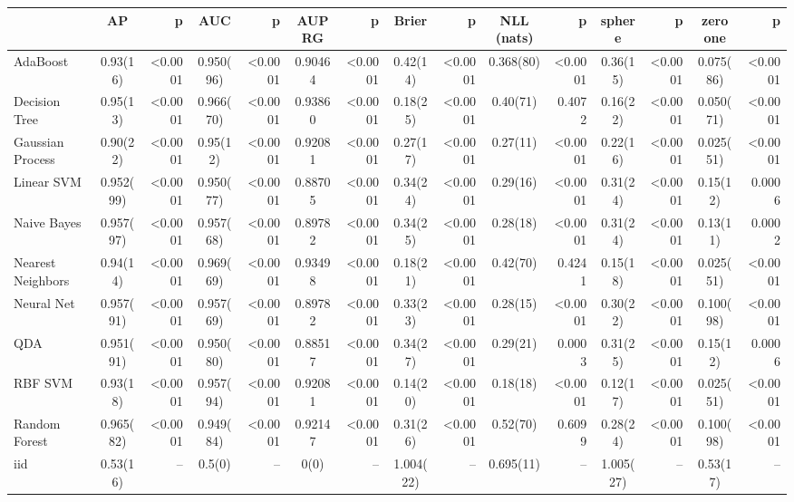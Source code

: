 \documentclass{article}
\begin{document}
{\tiny
\begin{tabular}{|l|Sr|Sr|Sr|Sr|Sr|Sr|Sr|}
\toprule
{}                &       {AP} &      {p} &      {AUC} &      {p} &  {AUPRG} &      {p} &    {Brier} &      {p} & {NLL (nats)} &      {p} &   {sphere} &      {p} & {zero one} &      {p} \\
\midrule
AdaBoost          &  0.93(16)  &  <0.0001 &  0.950(96) &  <0.0001 &  0.90464 &  <0.0001 &  0.42(14)  &  <0.0001 &    0.368(80) &  <0.0001 &  0.36(15)  &  <0.0001 &  0.075(86) &  <0.0001 \\
Decision Tree     &  0.95(13)  &  <0.0001 &  0.966(70) &  <0.0001 &  0.93860 &  <0.0001 &  0.18(25)  &  <0.0001 &    0.40(71)  &   0.4072 &  0.16(22)  &  <0.0001 &  0.050(71) &  <0.0001 \\
Gaussian Process  &  0.90(22)  &  <0.0001 &  0.95(12)  &  <0.0001 &  0.92081 &  <0.0001 &  0.27(17)  &  <0.0001 &    0.27(11)  &  <0.0001 &  0.22(16)  &  <0.0001 &  0.025(51) &  <0.0001 \\
Linear SVM        &  0.952(99) &  <0.0001 &  0.950(77) &  <0.0001 &  0.88705 &  <0.0001 &  0.34(24)  &  <0.0001 &    0.29(16)  &  <0.0001 &  0.31(24)  &  <0.0001 &  0.15(12)  &   0.0006 \\
Naive Bayes       &  0.957(97) &  <0.0001 &  0.957(68) &  <0.0001 &  0.89782 &  <0.0001 &  0.34(25)  &  <0.0001 &    0.28(18)  &  <0.0001 &  0.31(24)  &  <0.0001 &  0.13(11)  &   0.0002 \\
Nearest Neighbors &  0.94(14)  &  <0.0001 &  0.969(69) &  <0.0001 &  0.93498 &  <0.0001 &  0.18(21)  &  <0.0001 &    0.42(70)  &   0.4241 &  0.15(18)  &  <0.0001 &  0.025(51) &  <0.0001 \\
Neural Net        &  0.957(91) &  <0.0001 &  0.957(69) &  <0.0001 &  0.89782 &  <0.0001 &  0.33(23)  &  <0.0001 &    0.28(15)  &  <0.0001 &  0.30(22)  &  <0.0001 &  0.100(98) &  <0.0001 \\
QDA               &  0.951(91) &  <0.0001 &  0.950(80) &  <0.0001 &  0.88517 &  <0.0001 &  0.34(27)  &  <0.0001 &    0.29(21)  &   0.0003 &  0.31(25)  &  <0.0001 &  0.15(12)  &   0.0006 \\
RBF SVM           &  0.93(18)  &  <0.0001 &  0.957(94) &  <0.0001 &  0.92081 &  <0.0001 &  0.14(20)  &  <0.0001 &    0.18(18)  &  <0.0001 &  0.12(17)  &  <0.0001 &  0.025(51) &  <0.0001 \\
Random Forest     &  0.965(82) &  <0.0001 &  0.949(84) &  <0.0001 &  0.92147 &  <0.0001 &  0.31(26)  &  <0.0001 &    0.52(70)  &   0.6099 &  0.28(24)  &  <0.0001 &  0.100(98) &  <0.0001 \\
iid               &  0.53(16)  &     {--} &  0.5(0)    &     {--} &  0(0)    &     {--} &  1.004(22) &     {--} &    0.695(11) &     {--} &  1.005(27) &     {--} &  0.53(17)  &     {--} \\
\bottomrule
\end{tabular}
}
\end{document}
